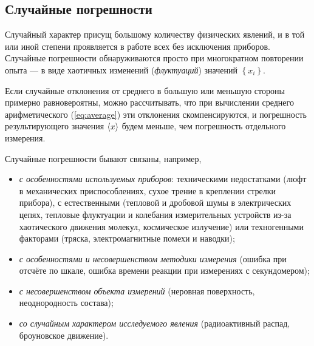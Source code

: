 
\subsection{Случайные погрешности}

Случайный характер присущ большому количеству физических
явлений, и в той или иной степени проявляется в работе всех без исключения
приборов. Случайные погрешности обнаруживаются просто при многократном
повторении опыта --- в виде хаотичных изменений (\emph{флуктуаций})
значений $\left\{ x_{i}\right\} $.

Если случайные отклонения от среднего в большую или меньшую стороны
примерно равновероятны, можно рассчитывать, что при вычислении среднего
арифметического (\ref{eq:average}) эти отклонения скомпенсируются,
и погрешность результирующего значения $\left<x\right>$ будем меньше,
чем погрешность отдельного измерения.

Случайные погрешности бывают связаны, например,
\begin{itemize}
    \item \emph{с особенностями используемых приборов}: техническими
недостатками
(люфт в механических приспособлениях, сухое трение в креплении стрелки
прибора), с естественными (тепловой и дробовой шумы в электрических
цепях, тепловые флуктуации и колебания измерительных устройств из-за
хаотического движения молекул, космическое излучение) или техногенными
факторами (тряска, электромагнитные помехи и наводки);

    \item \emph{с особенностями и несовершенством методики измерения} (ошибка
при отсчёте по шкале, ошибка времени реакции при измерениях с секундомером);

    \item \emph{с несовершенством объекта измерений} (неровная поверхность,
неоднородность состава);

    \item \emph{со случайным характером исследуемого явления} (радиоактивный
распад, броуновское движение).
\end{itemize}

